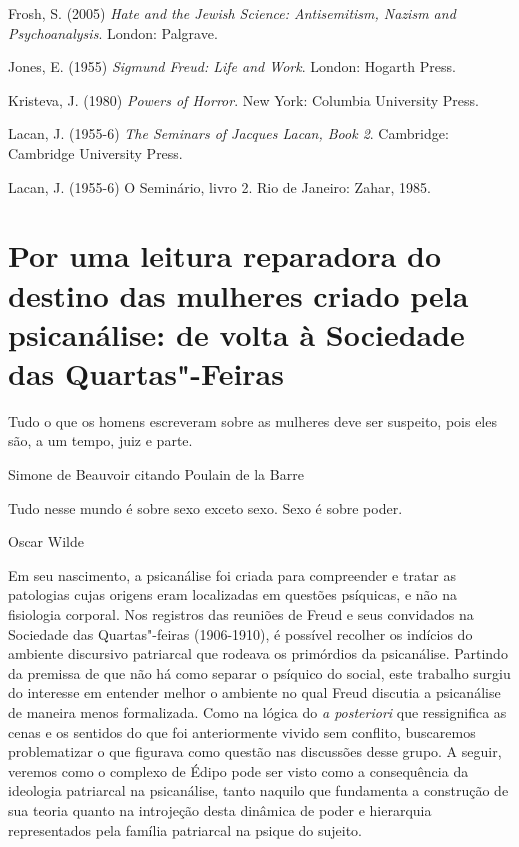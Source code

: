 Frosh, S. (2005) \emph{Hate and the Jewish Science: Antisemitism, Nazism
and Psychoanalysis}. London: Palgrave.

Jones, E. (1955) \emph{Sigmund Freud: Life and Work}. London: Hogarth
Press.

Kristeva, J. (1980) \emph{Powers of Horror}. New York: Columbia
University Press.

Lacan, J. (1955-6) \emph{The Seminars of Jacques Lacan, Book 2}.
Cambridge: Cambridge University Press.

Lacan, J. (1955-6) O Seminário, livro 2. Rio de Janeiro: Zahar, 1985.

\chapter*{Por uma leitura reparadora do destino das mulheres criado
pela psicanálise: de volta à Sociedade das Quartas"-Feiras}


\epigraph{Tudo o que os homens escreveram sobre as mulheres deve ser suspeito,
pois eles são, a um tempo, juiz e parte.}{Simone de Beauvoir citando Poulain de la Barre}

\epigraph{Tudo nesse mundo é sobre sexo exceto sexo. Sexo é sobre poder.}{Oscar Wilde}

Em seu nascimento, a psicanálise foi criada para compreender e tratar as
patologias cujas origens eram localizadas em questões psíquicas, e não
na fisiologia corporal. Nos registros das reuniões de Freud e seus
convidados na Sociedade das Quartas"-feiras (1906-1910), é possível
recolher os indícios do ambiente discursivo patriarcal que rodeava os
primórdios da psicanálise. Partindo da premissa de que não há como
separar o psíquico do social, este trabalho surgiu do interesse em
entender melhor o ambiente no qual Freud discutia a psicanálise de
maneira menos formalizada. Como na lógica do \emph{a posteriori} que
ressignifica as cenas e os sentidos do que foi anteriormente vivido sem
conflito, buscaremos problematizar o que figurava como questão nas
discussões desse grupo. A seguir, veremos como o complexo de Édipo pode
ser visto como a consequência da ideologia patriarcal na psicanálise,
tanto naquilo que fundamenta a construção de sua teoria quanto na
introjeção desta dinâmica de poder e hierarquia representados pela
família patriarcal na psique do sujeito.

